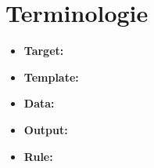 \section{Terminologie}

	\begin{itemize}
		\item \textbf{Target:}
		\item \textbf{Template:}
		\item \textbf{Data:}
		\item \textbf{Output:}
		\item \textbf{Rule:} 
	\end{itemize}